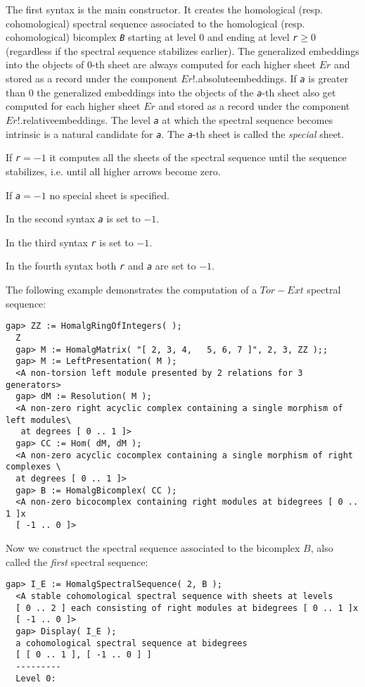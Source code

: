 \documentclass[a4paper,11pt]{report}
\begin{document}
{{{ The first syntax is the main constructor. It creates the homological (resp.
cohomological) spectral sequence associated to the homological (resp.
cohomological) bicomplex \mbox{\texttt{\slshape B}} starting at level $0$ and ending at level \mbox{\texttt{\slshape r}}$\geq 0$ (regardless if the spectral sequence stabilizes earlier). The generalized
embeddings into the objects of 0-th sheet are always computed for each higher
sheet $Er$ and stored as a record under the component $Er$!.absolute{\textunderscore}embeddings. If \mbox{\texttt{\slshape a}} is greater than $0$ the generalized embeddings into the objects of the \mbox{\texttt{\slshape a}}-th sheet also get computed for each higher sheet $Er$ and stored as a record under the component $Er$!.relative{\textunderscore}embeddings. The level \mbox{\texttt{\slshape a}} at which the spectral sequence becomes intrinsic is a natural candidate for \mbox{\texttt{\slshape a}}. The \mbox{\texttt{\slshape a}}-th sheet is called the \emph{special} sheet. 

 If \mbox{\texttt{\slshape r}}$=-1$ it computes all the sheets of the spectral sequence until the sequence
stabilizes, i.e. until all higher arrows become zero. 

 If \mbox{\texttt{\slshape a}}$=-1$ no special sheet is specified. 

 In the second syntax \mbox{\texttt{\slshape a}} is set to $-1$. 

 In the third syntax \mbox{\texttt{\slshape r}} is set to $-1$. 

 In the fourth syntax both \mbox{\texttt{\slshape r}} and \mbox{\texttt{\slshape a}} are set to $-1$. 

 The following example demonstrates the computation of a $Tor-Ext$ spectral sequence: 
\begin{Verbatim}[fontsize=\small,frame=single,label=Example]
  gap> ZZ := HomalgRingOfIntegers( );
  Z
  gap> M := HomalgMatrix( "[ 2, 3, 4,   5, 6, 7 ]", 2, 3, ZZ );;
  gap> M := LeftPresentation( M );
  <A non-torsion left module presented by 2 relations for 3 generators>
  gap> dM := Resolution( M );
  <A non-zero right acyclic complex containing a single morphism of left modules\
   at degrees [ 0 .. 1 ]>
  gap> CC := Hom( dM, dM );
  <A non-zero acyclic cocomplex containing a single morphism of right complexes \
  at degrees [ 0 .. 1 ]>
  gap> B := HomalgBicomplex( CC );
  <A non-zero bicocomplex containing right modules at bidegrees [ 0 .. 1 ]x
  [ -1 .. 0 ]>
\end{Verbatim}
 Now we construct the spectral sequence associated to the bicomplex $B$, also called the \emph{first} spectral sequence: 
\begin{Verbatim}[fontsize=\small,frame=single,label=Example]
  gap> I_E := HomalgSpectralSequence( 2, B );
  <A stable cohomological spectral sequence with sheets at levels 
  [ 0 .. 2 ] each consisting of right modules at bidegrees [ 0 .. 1 ]x
  [ -1 .. 0 ]>
  gap> Display( I_E );
  a cohomological spectral sequence at bidegrees
  [ [ 0 .. 1 ], [ -1 .. 0 ] ]
  ---------
  Level 0:
  

\end{Verbatim}}}}
\end{document}

